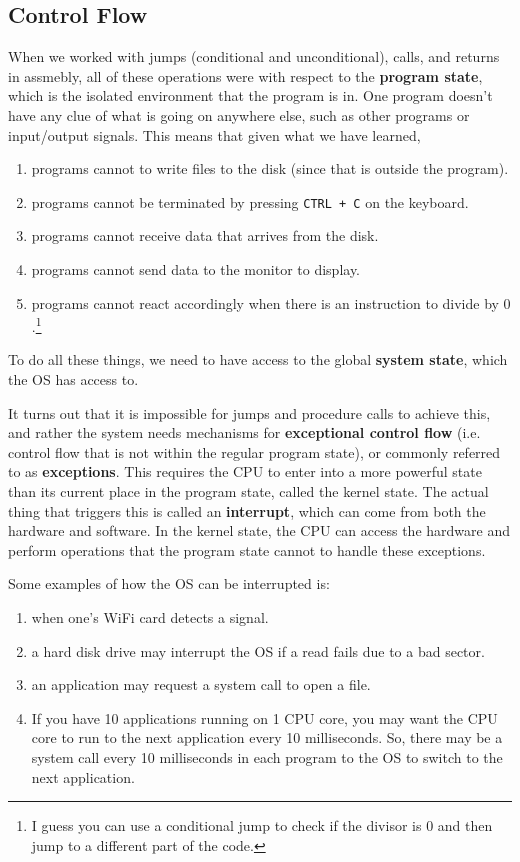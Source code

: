 \documentclass{article}
\begin{document}
  \subsection{Control Flow}

    When we worked with jumps (conditional and unconditional), calls, and returns in assmebly, all of these operations were with respect to the \textbf{program state}, which is the isolated environment that the program is in. One program doesn't have any clue of what is going on anywhere else, such as other programs or input/output signals. This means that given what we have learned, 
    \begin{enumerate}
      \item programs cannot to write files to the disk (since that is outside the program). 
      \item programs cannot be terminated by pressing \texttt{CTRL + C} on the keyboard. 
      \item programs cannot receive data that arrives from the disk. 
      \item programs cannot send data to the monitor to display. 
      \item programs cannot react accordingly when there is an instruction to divide by $0$.\footnote{I guess you can use a conditional jump to check if the divisor is $0$ and then jump to a different part of the code.}
    \end{enumerate}
    To do all these things, we need to have access to the global \textbf{system state}, which the OS has access to. 

    It turns out that it is impossible for jumps and procedure calls to achieve this, and rather the system needs mechanisms for \textbf{exceptional control flow} (i.e. control flow that is not within the regular program state), or commonly referred to as \textbf{exceptions}. This requires the CPU to enter into a more powerful state than its current place in the program state, called the kernel state. The actual thing that triggers this is called an \textbf{interrupt}, which can come from both the hardware and software. In the kernel state, the CPU can access the hardware and perform operations that the program state cannot to handle these exceptions. 

    \begin{example}[Interrupts]
      Some examples of how the OS can be interrupted is: 
      \begin{enumerate}
        \item when one's WiFi card detects a signal. 
        \item a hard disk drive may interrupt the OS if a read fails due to a bad sector. 
        \item an application may request a system call to open a file. 
        \item If you have 10 applications running on 1 CPU core, you may want the CPU core to run to the next application every 10 milliseconds. So, there may be a system call every 10 milliseconds in each program to the OS to switch to the next application. 
      \end{enumerate}
    \end{example}
\end{document}
